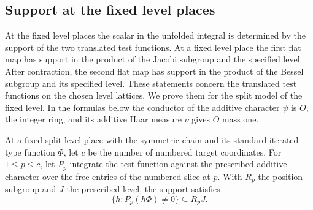 \subsection{Support at the fixed level places}
\label{subsec:fixed-level-support}

At the fixed level places the scalar in the unfolded integral is determined by the support of the two translated test functions. At a fixed level place the first flat map
has support in the product of the Jacobi subgroup and the
specified level. After contraction, the second flat map
has support in the product of the Bessel subgroup and its
specified level. These statements concern the translated
test functions on the chosen level lattices. We prove them
for the split model of the fixed level. In the formulas below
the conductor of the additive character \(\psi\) is \(O\),
the integer ring, and its additive Haar measure \(\nu\)
gives \(O\) mass one.

\begin{lemma}\label{lem:split-position-support}
At a fixed split level place with the symmetric chain and
its standard iterated type function \(\Phi\), let \(c\) be the number of numbered target coordinates. For \(1\le p\le c\), let \(P_p\) integrate the test function against the prescribed additive character over the free entries of the numbered slice at \(p\). With \(R_p\) the position subgroup and \(J\) the prescribed level, the support satisfies
\[
 \{h:P_p(h\Phi)\ne0\}\subseteq R_pJ.
\]

\end{lemma}

